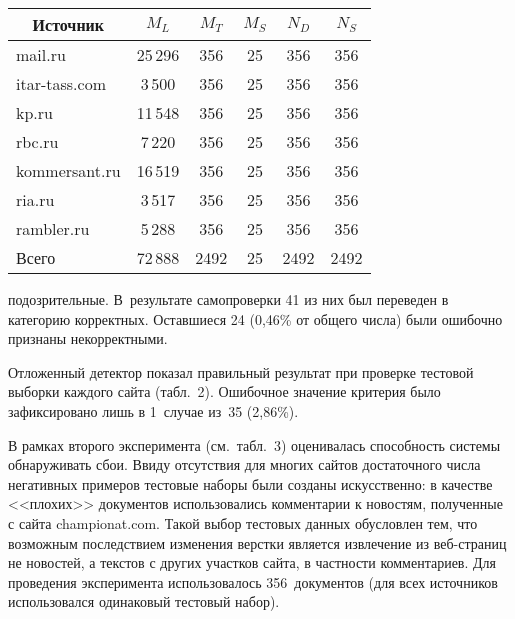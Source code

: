 \begin{multicols}{2}
{\small
  
  \begin{center}

\tabcolsep=5pt
\begin{tabular}{|l|c|c|c|c|c|}
\hline
\multicolumn{1}{|c|}{Источник}&$M_L$&$M_T$&$M_S$&$N_D$&$N_S$\\
\hline
{\sf mail.ru}&25\,296&356&25&356&356\\
{\sf itar-tass.com}&\hphantom{9}3\,500&356&25&356&356\\
{\sf kp.ru}&11\,548&356&25&356&356\\
{\sf rbc.ru}&\hphantom{9}7\,220&356&25&356&356\\
{\sf kommersant.ru}&16\,519&356&25&356&356\\
{\sf ria.ru}&\hphantom{9}3\,517&356&25&356&356\\
{\sf rambler.ru}&\hphantom{9}5\,288&356&25&356&356\\
\hline
Всего&72\,888&2492\hphantom{9}&25&2492\hphantom{9}&2492\hphantom{9}\\
\hline
\end{tabular}
\end{center}
}

\addtocounter{table}{1}
  
\noindent
подозрительные. В~результате самопроверки 41 из них был переведен в 
категорию корректных. Оставшиеся 24 (0,46\% от общего числа) были 
ошибочно признаны некорректными. 
  

  Отложенный детектор показал правильный результат при проверке тестовой 
выборки каждого сайта (табл.~2). Ошибочное значение критерия было 
зафиксировано лишь в 1~случае из~35 (2,86\%). 
  
  В рамках второго эксперимента (см.\ табл.~3) оценивалась способность 
системы обнаруживать сбои. Ввиду отсутствия для многих сайтов достаточного 
числа негативных примеров тестовые наборы были созданы искусственно: в 
качестве <<плохих>> документов использовались комментарии к новостям, 
полученные с сайта {\sf championat.com}. Такой выбор тестовых данных 
обусловлен тем, что возможным последствием изменения верстки является 
извлечение из веб-стра\-ниц не новостей, а текстов с других участков сайта, в 
частности комментариев. Для проведения эксперимента использовалось 
356~документов (для всех источников использовался одинаковый тестовый 
набор).
  

\end{multicols}
